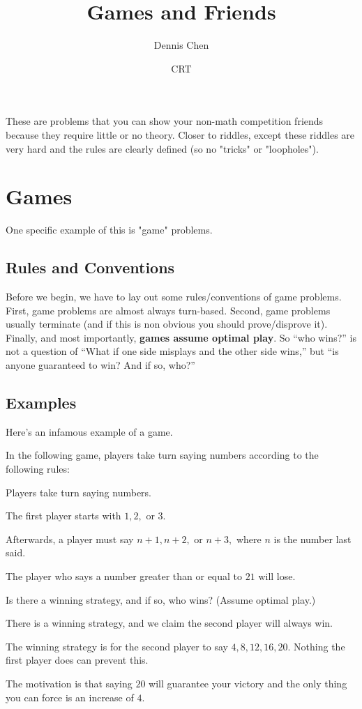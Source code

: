 \documentclass[mast]{lucky}
\title{Games and Friends}
\author{Dennis Chen}
\date{CRT}
\begin{document}
\maketitle
These are problems that you can show your non-math competition friends because they require little or no theory. Closer to riddles, except these riddles are very hard and the rules are clearly defined (so no "tricks" or "loopholes").

\section{Games}
One specific example of this is "game" problems.

\subsection{Rules and Conventions}
Before we begin, we have to lay out some rules/conventions of game problems. First, game problems are almost always turn-based. Second, game problems usually terminate (and if this is non obvious you should prove/disprove it). Finally, and most importantly, \textbf{games assume optimal play}. So ``who wins?'' is not a question of ``What if one side misplays and the other side wins,'' but ``is anyone guaranteed to win? And if so, who?''

\subsection{Examples}
Here's an infamous example of a game.

\begin{exam}[21 Game]
In the following game, players take turn saying numbers according to the following rules:
\begin{itemize}
    \Item Players take turn saying numbers.

    \Item The first player starts with $1,2,$ or $3.$
    
    \Item Afterwards, a player must say $n+1,n+2,$ or $n+3,$ where $n$ is the number last said.
    
    \Item The player who says a number greater than or equal to $21$ will lose.
\end{itemize}

Is there a winning strategy, and if so, who wins? (Assume optimal play.)
\end{exam}

\begin{sol}
There is a winning strategy, and we claim the second player will always win.

The winning strategy is for the second player to say $4,8,12,16,20.$ Nothing the first player does can prevent this.
\end{sol}
The motivation is that saying $20$ will guarantee your victory and the only thing you can force is an increase of $4.$
\end{document}
